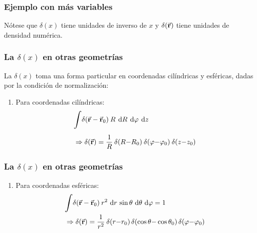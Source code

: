 \documentclass[12pt]{beamer}
\begin{document}
\begin{frame}
\frametitle{Ejemplo con más variables}
Nótese que $\delta (x)$ tiene unidades de inverso de $x$ y $\delta (\va{r})$ tiene unidades de densidad numérica.
\end{frame}
\begin{frame}
\frametitle{La $\delta (x)$ en otras geometrías}
La $\delta (x)$ toma una forma particular en coordenadas cilíndricas y esféricas, dadas por la condición de normalización:
\pause
{}
\begin{enumerate}
\item Para coordenadas cilíndricas:
\begin{align*}
\begin{aligned}
&\scaleint{6ex} \delta (\va{r} - \va{r}_{0}) \: R \: \dd{R} \: \dd{\varphi} \: \dd{z} \\[0.5em]
&\Rightarrow \delta (\va{r}) =  \dfrac{1}{R} \: \delta (R {-} R_{0}) \: \delta (\varphi {-} \varphi_{0}) \: \delta (z {-} z_{0})
\end{aligned}
\end{align*}
\seti
\end{enumerate}
\end{frame}
\begin{frame}
\frametitle{La $\delta (x)$ en otras geometrías}
\begin{enumerate}
\conti
\item Para coordenadas esféricas:
\begin{align*}
\begin{aligned}
&\scaleint{6ex} \delta (\va{r} - \va{r}_{0}) \: r^{2} \, \dd{r} \, \sin \theta \, \dd{\theta} \, \dd{\varphi} = 1 \\
&\Rightarrow \delta (\va{r}) = \dfrac{1}{r^{2}} \: \delta (r {-} r_{0}) \, \delta (\cos \theta {-} \cos \theta_{0}) \, \delta (\varphi {-} \varphi_{0})
\end{aligned}
\end{align*}
\end{enumerate}
\end{frame}
\end{document}
